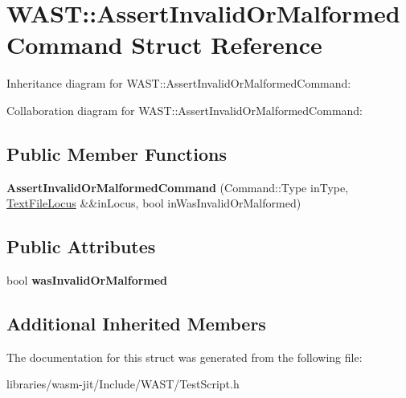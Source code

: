 \hypertarget{struct_w_a_s_t_1_1_assert_invalid_or_malformed_command}{}\section{W\+A\+ST\+:\+:Assert\+Invalid\+Or\+Malformed\+Command Struct Reference}
\label{struct_w_a_s_t_1_1_assert_invalid_or_malformed_command}


Inheritance diagram for W\+A\+ST\+:\+:Assert\+Invalid\+Or\+Malformed\+Command\+:


Collaboration diagram for W\+A\+ST\+:\+:Assert\+Invalid\+Or\+Malformed\+Command\+:
\subsection*{Public Member Functions}
\begin{DoxyCompactItemize}
\item 
\mbox{\label{struct_w_a_s_t_1_1_assert_invalid_or_malformed_command_a7752118e79c4488e8fc76e59596bfa5a}} 
{\bfseries Assert\+Invalid\+Or\+Malformed\+Command} (Command\+::\+Type in\+Type, \mbox{\hyperlink{struct_w_a_s_t_1_1_text_file_locus}{Text\+File\+Locus}} \&\&in\+Locus, bool in\+Was\+Invalid\+Or\+Malformed)
\end{DoxyCompactItemize}
\subsection*{Public Attributes}
\begin{DoxyCompactItemize}
\item 
\mbox{\label{struct_w_a_s_t_1_1_assert_invalid_or_malformed_command_af6ffff669950141e612dcc7ff71ee676}} 
bool {\bfseries was\+Invalid\+Or\+Malformed}
\end{DoxyCompactItemize}
\subsection*{Additional Inherited Members}


The documentation for this struct was generated from the following file\+:\begin{DoxyCompactItemize}
\item 
libraries/wasm-\/jit/\+Include/\+W\+A\+S\+T/Test\+Script.\+h\end{DoxyCompactItemize}
